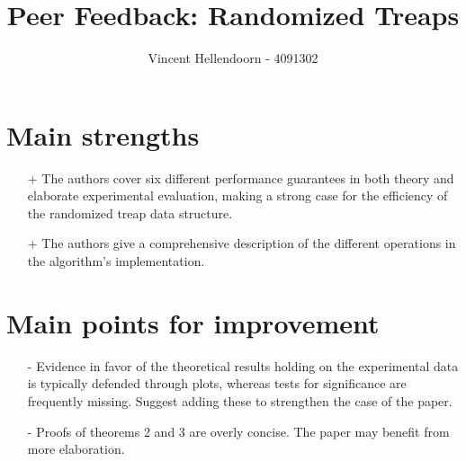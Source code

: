 \documentclass[11pt,a4paper,oneside,fleqn]{article}
\begin{document}
\title{Peer Feedback: Randomized Treaps}
\author{Vincent Hellendoorn - 4091302}
\maketitle

\section*{Main strengths}
\begin{itemize}[topsep=0pt,itemsep=-1ex,partopsep=1ex,parsep=1ex,leftmargin=+7mm]
\item[+] The authors cover six different performance guarantees in both theory and elaborate experimental evaluation, making a strong case for the efficiency of the randomized treap data structure.
\item[+] The authors give a comprehensive description of the different operations in the algorithm's implementation.
\end{itemize}

\section*{Main points for improvement}
\begin{itemize}[topsep=0pt,itemsep=-1ex,partopsep=1ex,parsep=1ex,leftmargin=+7mm]
\item[-] Evidence in favor of the theoretical results holding on the experimental data is typically defended through plots, whereas tests for significance are frequently missing. Suggest adding these to strengthen the case of the paper.
\item[-] Proofs of theorems 2 and 3 are overly concise. The paper may benefit from more elaboration.
\end{itemize}
\end{document}
